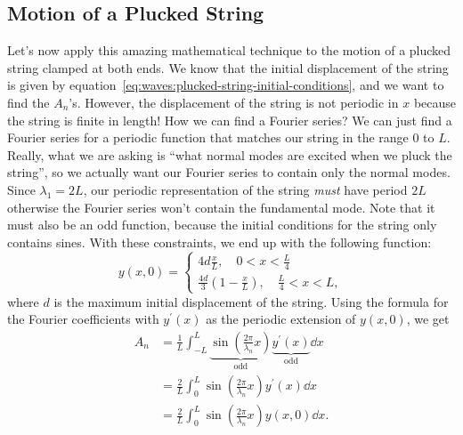 \documentclass[../classical_mechanics.tex]{subfiles}
\begin{document}
        \subsection{Motion of a Plucked String}\label{subsec:motion-of-a-plucked-string}
            Let's now apply this amazing mathematical technique to the motion of a plucked string clamped at both ends.
            We know that the initial displacement of the string is given by equation~\ref{eq:waves:plucked-string-initial-conditions}, and we want to find the $A_n$'s.
            However, the displacement of the string is not periodic in $x$ because the string is finite in length!
            How we can find a Fourier series?
            We can just find a Fourier series for a periodic function that matches our string in the range $0$ to $L$.
            Really, what we are asking is ``what normal modes are excited when we pluck the string'', so we actually want our Fourier series to contain only the normal modes.
            Since $\lambda_1=2L$, our periodic representation of the string \textit{must} have period $2L$ otherwise the Fourier series won't contain the fundamental mode.
            Note that it must also be an odd function, because the initial conditions for the string only contains sines.
            With these constraints, we end up with the following function:
            \begin{equation}
                y(x,0)=\begin{cases}
                    4d\frac{x}{L},\quad 0<x<\frac{L}{4}\\
                    \frac{4d}{3}\left(1-\frac{x}{L}\right),\quad\frac{L}{4}<x<L,
                \end{cases}
            \end{equation}
            where $d$ is the maximum initial displacement of the string.
            Using the formula for the Fourier coefficients with $y^\prime(x)$ as the periodic extension of $y(x,0)$, we get
            \begin{align}
                A_n&=\frac{1}{L}\int_{-L}^L\underbrace{\sin\left(\frac{2\pi}{\lambda_n}x\right)}_\text{odd}\underbrace{y^\prime(x)}_\text{odd}\dd{x}\\
                &=\frac{2}{L}\int_0^L\sin\left(\frac{2\pi}{\lambda_n}x\right)y^\prime(x)\dd{x}\\
                &=\frac{2}{L}\int_0^L\sin\left(\frac{2\pi}{\lambda_n}x\right)y(x,0)\dd{x}.
            \end{align}
\end{document}
